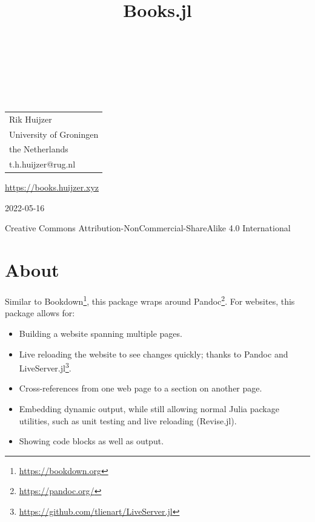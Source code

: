 \documentclass[
  notoc %
]{tufte-book}
\title{Books.jl}
\author{\noindent{Rik Huijzer}\\[3mm] \noindent{and
contributors}\\[3mm] }
\date{}
\DeclareRobustCommand{\href}[2]{#2\footnote{\url{#1}}}
\providecommand{\tightlist}{%
  \setlength{\itemsep}{0pt}\setlength{\parskip}{0pt}
}
\begin{document}
\makeatletter
\thispagestyle{empty}
\vfill
{\Huge\bf
\noindent
\@title
}\\[1in]
{\Large
\noindent
\@author
}
\makeatother

\makeatletter
\newpage
\thispagestyle{empty}
\vfill
{\noindent
\begin{tabular}{l} Rik Huijzer\\ University of Groningen\\ the Netherlands\\ t.h.huijzer@rug.nl\\ \end{tabular}
}
\vfill
{\small
\url{https://books.huijzer.xyz}

2022-05-16

Creative Commons Attribution-NonCommercial-ShareAlike 4.0 International
}
\makeatother


\frontmatter
\mainmatter

\setcounter{tocdepth}{1}
\tableofcontents

\justifying

\setlength{\parindent}{0pt}

\hypertarget{sec:about}{%
\chapter{About}\label{sec:about}}

Similar to \href{https://bookdown.org}{Bookdown}, this package wraps
around \href{https://pandoc.org/}{Pandoc}. For websites, this package
allows for:

\begin{itemize}
\tightlist
\item
  Building a website spanning multiple pages.
\item
  Live reloading the website to see changes quickly; thanks to Pandoc
  and \href{https://github.com/tlienart/LiveServer.jl}{LiveServer.jl}.
\item
  Cross-references from one web page to a section on another page.
\item
  Embedding dynamic output, while still allowing normal Julia package
  utilities, such as unit testing and live reloading (Revise.jl).
\item
  Showing code blocks as well as output.
\end{itemize}
\end{document}
